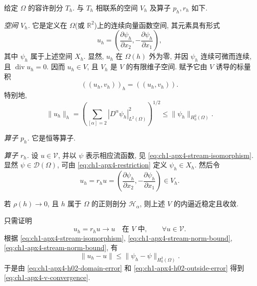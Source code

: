 给定 $\Omega$ 的容许剖分 $T_h$. 与 $T_h$ 相联系的空间 $V_h$ 及算子 $p_h,r_h$ 如下.

\emph{空间 $V_h$.} 它是定义在 $\Omega$(或 $\mathbb R^2$)上的连续向量函数空间, 其元素具有形式
\begin{equation}
u_h=\left(\frac{\partial\psi_h}{\partial x_2},
-\frac{\partial\psi_h}{\partial x_1}\right),
\label{eq:ch1-apx4-vh-stream-form}
\end{equation}
其中 $\psi_h$ 属于上述空间 $X_h$. 显然, $u_h$ 在 $\Omega(h)$ 外为零, 并因 $\psi_h$ 连续可微而连续, 且 $\operatorname{div}u_h=0$. 因而 $u_h\in V$, 且 $V_h$ 是 $V$ 的有限维子空间. 赋予它由 $V$ 诱导的标量积
\begin{equation}
((u_h,v_h))_h=((u_h,v_h)).
\label{eq:ch1-apx4-vh-product}
\end{equation}
特别地,
\begin{equation}
\|u_h\|_h
=\left(\sum_{[\alpha]=2}|D^\alpha\psi_h|_{L^2(\Omega)}^2\right)^{1/2}
\leq\|\psi_h\|_{H_0^2(\Omega)}.
\label{eq:ch1-apx4-stream-norm-bound}
\end{equation}

\emph{算子 $p_h$.} 它是恒等算子.

\emph{算子 $r_h$.} 设 $u\in\mathcal V$, 并以 $\psi$ 表示相应流函数, 见 \eqref{eq:ch1-apx4-stream-isomorphism}. 显然 $\psi\in\mathcal D(\Omega)$, 可由 \eqref{eq:ch1-apx4-restriction} 定义 $\psi_h\in X_h$. 然后令
\begin{equation}
u_h=r_hu=\left(\frac{\partial\psi_h}{\partial x_2},
-\frac{\partial\psi_h}{\partial x_1}\right)\in V_h.
\label{eq:ch1-apx4-restriction-v}
\end{equation}

\begin{Proposition}
\label{prop:ch1-apx4-v-stable-convergent}
若 $\rho(h)\to0$, 且 $h$ 属于 $\Omega$ 的正则剖分 $\mathcal H_\alpha$, 则上述 $V$ 的内逼近稳定且收敛.
\end{Proposition}

\begin{Proof}
只需证明
\begin{equation}
u_h=r_hu\longrightarrow u
\quad\text{在 }V\text{ 中},
\qquad\forall u\in\mathcal V.
\label{eq:ch1-apx4-v-convergence}
\end{equation}
根据 \eqref{eq:ch1-apx4-stream-isomorphism}, \eqref{eq:ch1-apx4-stream-norm-bound}, \eqref{eq:ch1-apx4-stream-norm-bound}, 有
\[
\|u_h-u\|\leq\|\psi_h-\psi\|_{H_0^2(\Omega)}.
\]
于是由 \eqref{eq:ch1-apx4-h02-domain-error} 和 \eqref{eq:ch1-apx4-h02-outside-error} 得到 \eqref{eq:ch1-apx4-v-convergence}.
\end{Proof}

